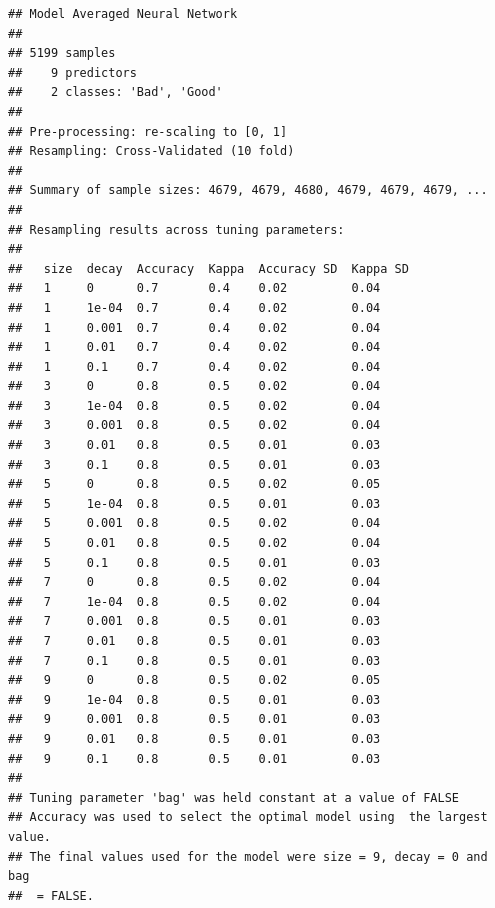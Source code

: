 \documentclass[english,nohyper,titlepage]{tufte-handout}\usepackage{knitr}
\begin{document}
\begin{knitrout}\footnotesize
{}\color{fgcolor}\begin{kframe}
\begin{alltt}
 \hlkwb{=} \hlopt{~}  \hlstd{=}\hlstd{,}
                      \hlstd{=}\hlstd{,}
                     \hlstd{=}\hlstd{,}  \hlstd{=}\hlstd{)}
\end{alltt}
\begin{verbatim}
## Model Averaged Neural Network 
## 
## 5199 samples
##    9 predictors
##    2 classes: 'Bad', 'Good' 
## 
## Pre-processing: re-scaling to [0, 1] 
## Resampling: Cross-Validated (10 fold) 
## 
## Summary of sample sizes: 4679, 4679, 4680, 4679, 4679, 4679, ... 
## 
## Resampling results across tuning parameters:
## 
##   size  decay  Accuracy  Kappa  Accuracy SD  Kappa SD
##   1     0      0.7       0.4    0.02         0.04    
##   1     1e-04  0.7       0.4    0.02         0.04    
##   1     0.001  0.7       0.4    0.02         0.04    
##   1     0.01   0.7       0.4    0.02         0.04    
##   1     0.1    0.7       0.4    0.02         0.04    
##   3     0      0.8       0.5    0.02         0.04    
##   3     1e-04  0.8       0.5    0.02         0.04    
##   3     0.001  0.8       0.5    0.02         0.04    
##   3     0.01   0.8       0.5    0.01         0.03    
##   3     0.1    0.8       0.5    0.01         0.03    
##   5     0      0.8       0.5    0.02         0.05    
##   5     1e-04  0.8       0.5    0.01         0.03    
##   5     0.001  0.8       0.5    0.02         0.04    
##   5     0.01   0.8       0.5    0.02         0.04    
##   5     0.1    0.8       0.5    0.01         0.03    
##   7     0      0.8       0.5    0.02         0.04    
##   7     1e-04  0.8       0.5    0.02         0.04    
##   7     0.001  0.8       0.5    0.01         0.03    
##   7     0.01   0.8       0.5    0.01         0.03    
##   7     0.1    0.8       0.5    0.01         0.03    
##   9     0      0.8       0.5    0.02         0.05    
##   9     1e-04  0.8       0.5    0.01         0.03    
##   9     0.001  0.8       0.5    0.01         0.03    
##   9     0.01   0.8       0.5    0.01         0.03    
##   9     0.1    0.8       0.5    0.01         0.03    
## 
## Tuning parameter 'bag' was held constant at a value of FALSE
## Accuracy was used to select the optimal model using  the largest value.
## The final values used for the model were size = 9, decay = 0 and bag
##  = FALSE.
\end{verbatim}
\end{kframe}
\end{knitrout}
\end{document}
